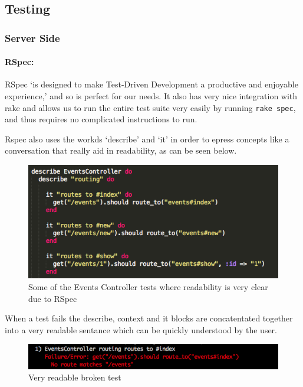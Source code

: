 \subsection{Testing}
  \subsubsection{Server Side}
    \paragraph{RSpec:}
      RSpec `is designed to make Test-Driven Development a productive and enjoyable experience,'\cite{rspec-overview} and so is perfect for our needs. It also has very nice integration with rake and allows us to run the entire test suite very easily by running \verb!rake spec!, and thus requires no complicated instructions to run.

      Rspec also uses the workds `describe' and `it' in order to epress concepts like a conversation that really aid in readability, as can be seen below.

      \begin{figure}[H]\centering
      \includegraphics[scale=0.5]{images/project_management/testing/rspec_events_controller}
      \caption{Some of the Events Controller tests where readability is very clear due to RSpec}
      \end{figure}

      When a test fails the describe, context and it blocks are concatentated together into a very readable sentance which can be quickly understood by the user. 
      
      \begin{figure}[H]\centering
      \includegraphics[scale=0.5]{images/project_management/testing/rspec_events_contoller_broken}
      \caption{Very readable broken test}
      \end{figure}

